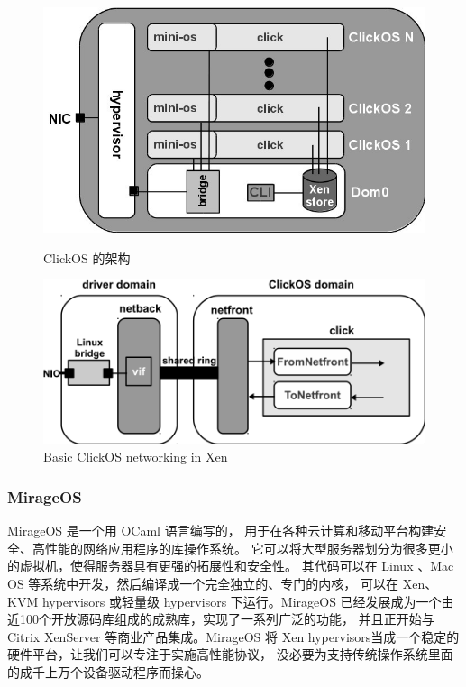 \documentclass{../runikraft-report}
\begin{document}
\begin{figure}[!hbt]
\begin{minipage}{0.49\linewidth}
\includegraphics[width=\linewidth]{../assets/clickOS_arch.jpg}
\caption{ClickOS 的架构\cite{bib:13-clickos2}}
\end{minipage}
\begin{minipage}{0.49\linewidth}
\includegraphics[width=\linewidth]{../assets/ClickOS_networking.png}
\caption{Basic ClickOS networking in Xen\cite{bib:12-clickos}}
\end{minipage}
\end{figure}

\subsubsection{MirageOS}

MirageOS 是一个用 OCaml 语言编写的，
用于在各种云计算和移动平台构建安全、高性能的网络应用程序的库操作系统。
它可以将大型服务器划分为很多更小的虚拟机，使得服务器具有更强的拓展性和安全性。
其代码可以在 Linux 、Mac OS 等系统中开发，然后编译成一个完全独立的、专门的内核，
可以在 Xen、KVM hypervisors 或轻量级 hypervisors 下运行。MirageOS
已经发展成为一个由近100个开放源码库组成的成熟库，实现了一系列广泛的功能，
并且正开始与 Citrix XenServer 等商业产品集成。MirageOS
将 Xen hypervisors当成一个稳定的硬件平台，让我们可以专注于实施高性能协议，
没必要为支持传统操作系统里面的成千上万个设备驱动程序而操心。\cite{bib:11-unikerel2}
\end{document}
